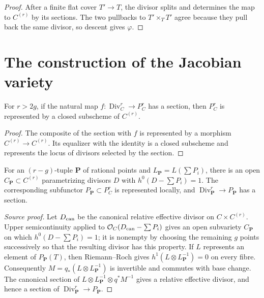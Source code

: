 \begin{proof}

After a finite flat cover $T'\to T$, the divisor splits and determines the map to $C^{(r)}$ by its sections. The two pullbacks to $T'\times_TT'$ agree because they pull back the same divisor, so descent gives $\varphi$.

\end{proof}


\section{The construction of the Jacobian variety}
\begin{lemma}\label{lem:milne-jacobian-section}
For $r>2g$, if the natural map $f:\operatorname{Div}_C^r\to P_C^r$ has a section, then $P_C^r$ is represented by a closed subscheme of $C^{(r)}$.
\end{lemma}

\begin{proof}

The composite of the section with $f$ is represented by a morphism $C^{(r)}\to C^{(r)}$. Its equalizer with the identity is a closed subscheme and represents the locus of divisors selected by the section.

\end{proof}

\begin{proposition}\label{prop:milne-jacobian-local-sections}
For an $(r-g)$-tuple $\mathbf P$ of rational points and $L_{\mathbf P}=L(\sum P_i)$, there is an open $C_{\mathbf P}\subset C^{(r)}$ parametrizing divisors $D$ with $h^0(D-\sum P_i)=1$. The corresponding subfunctor $P_{\mathbf P}\subset P_C^r$ is represented locally, and $\operatorname{Div}_{\mathbf P}^r\to P_{\mathbf P}$ has a section.
\end{proposition}

\begin{proof}[Source proof]
Let $D_{\rm can}$ be the canonical relative effective divisor on
$C\times C^{(r)}$.  Upper semicontinuity applied to
$\mathcal O_C(D_{\rm can}-\sum P_i)$ gives an open subvariety
$C_{\mathbf P}$ on which $h^0(D-\sum P_i)=1$; it is nonempty by choosing the
remaining $g$ points successively so that the resulting divisor has this
property.  If $L$ represents an element of $P_{\mathbf P}(T)$, then
Riemann--Roch gives $h^1(L\otimes L_{\mathbf P}^{-1})=0$ on every fibre.
Consequently $M=q_*(L\otimes L_{\mathbf P}^{-1})$ is invertible and commutes
with base change.  The canonical section of
$L\otimes L_{\mathbf P}^{-1}\otimes q^*M^{-1}$ gives a relative effective
divisor, and hence a section of
$\operatorname{Div}_{\mathbf P}^r\to P_{\mathbf P}$.
\end{proof}

